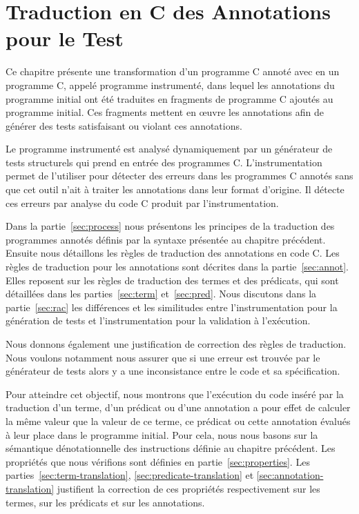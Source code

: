 
\chapter{Traduction en C des Annotations pour le Test}
\label{sec:traduction}

\chapterintro

Ce chapitre présente une transformation d'un programme C annoté avec \eacsl en
un programme C, appelé programme instrumenté, dans lequel les annotations
\eacsl du programme initial ont été traduites en fragments de programme C
ajoutés au programme initial.
Ces fragments mettent en \oe{}uvre les annotations \eacsl afin de générer des
tests satisfaisant ou violant ces annotations.

Le programme instrumenté est analysé dynamiquement par un générateur de tests
structurels qui prend en entrée des programmes C.
L'instrumentation permet de l'utiliser pour détecter des erreurs dans les
programmes C annotés sans que cet outil n'ait à traiter les annotations dans
leur format d'origine.
Il détecte ces erreurs par analyse du code C produit par l'instrumentation.

Dans la partie~\ref{sec:process} nous présentons les principes de la traduction
des programmes annotés définis par la syntaxe présentée au chapitre précédent.
Ensuite nous détaillons les règles de traduction des annotations \eacsl en code
C.
Les règles de traduction pour les annotations sont décrites dans la
partie~\ref{sec:annot}.
Elles reposent sur les règles de traduction des termes et des prédicats, qui
sont détaillées dans les parties~\ref{sec:term} et~\ref{sec:pred}.
Nous discutons dans la partie~\ref{sec:rac} les différences et les
similitudes entre l'instrumentation pour la génération de tests et
l'instrumentation pour la validation à l'exécution.

Nous donnons également une justification de correction des règles de
traduction.
Nous voulons notamment nous assurer que si une erreur est trouvée par le
générateur de tests alors y a une inconsistance entre le code et sa
spécification.

Pour atteindre cet objectif, nous montrons que l'exécution du code inséré par
la traduction d'un terme, d'un prédicat ou d'une annotation a pour effet de
calculer la même valeur que la valeur de ce terme, ce prédicat ou cette
annotation évalués à leur place dans le programme initial.
Pour cela, nous nous basons sur la sémantique dénotationnelle des instructions
définie au chapitre précédent.
Les propriétés que nous vérifions sont définies en partie~\ref{sec:properties}.
Les parties~\ref{sec:term-translation}, \ref{sec:predicate-translation} et
\ref{sec:annotation-translation} justifient la correction de ces propriétés
respectivement sur les termes, sur les prédicats et sur les annotations.


